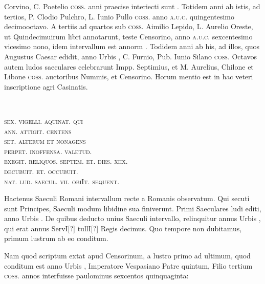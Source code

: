 Corvino, C. Poetelio \textsc{coss.} anni praecise interiecti sunt .
Totidem
anni ab istis, ad tertios, P. Clodio Pulchro, L. Iunio Pullo \textsc{coss.}
anno \textsc{a.u.c.} quingentesimo decimooctavo.
A tertiis ad quartos sub
\textsc{coss.} Aimilio Lepido, L. Aurelio Oreste, ut Quindecimuirum
libri annotarunt, teste Censorino, anno \textsc{a.u.c.} sexcentesimo vicesimo
nono, idem intervallum est annorm .
Todidem anni ab
his, ad illos, quos Augustus Caesar edidit, anno Urbis ,
C. Furnio, Pub. Iunio Silano \textsc{coss.} Octavos autem ludos saeculares
celebrarunt Impp. Septimius, et M. Aurelius, Chilone et Libone
\textsc{coss.} auctoribus Nummis, et Censorino.
Horum mentio est
in hac veteri inscriptione agri Casinatis.
%
\begin{center}
\providelength{\emenlen}
\parbox{\emenlen}{
  \\
  \raggedright\textsc{sex. vigelli. aquinat. qui\\
  ann. attigit. centens\\
  set. alterum et nonagens\\
  perpet. inoffensa. valetud.\\
  exegit. reliquos. septem. et. dies. xiix.\\
  \hspace{4ex} decubuit. et. occubuit.\\
  nat. lud. saecul. vii. obiIt. sequent.}
}
\end{center}
Hactenus Saeculi Romani intervallum recte a
 Romanis observatum.
Qui secuti sunt Principes, Saeculi modum libidine sua finiverunt.
Primi
Saeculares ludi editi, anno Urbis .
De quibus deducto
unius Saeculi intervallo, relinquitur annus Urbis , qui
erat annus ServI[?] tullI[?] Regis decimus. %
Quo tempore non dubitamus,
primum lustrum ab eo conditum.
\begin{table}[tb]
  
\end{table}
%
Nam quod scriptum extat apud
Censorinum, a lustro primo ad ultimum, quod conditum est anno
Urbis , Imperatore Vespasiano Patre quintum, Filio
tertium \textsc{coss.} annos
interfuisse paulominus
sexcentos quinquaginta:
